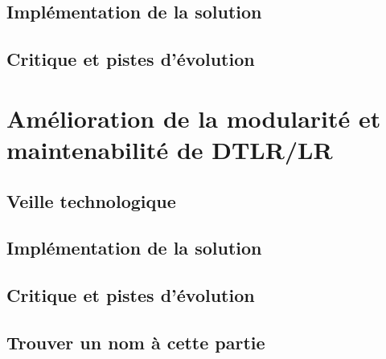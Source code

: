     \subsection{Implémentation de la solution}
    \subsection{Critique et pistes d'évolution}
        
    
\section{Amélioration de la modularité et maintenabilité de DTLR/LR}
    \subsection{Veille technologique}
    \subsection{Implémentation de la solution}
    \subsection{Critique et pistes d'évolution}

\subsection{Trouver un nom à cette partie}
